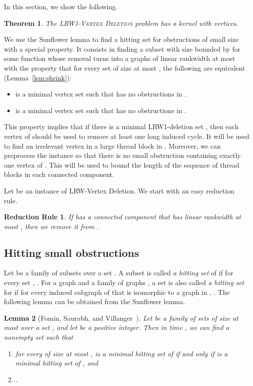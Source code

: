 \documentclass[11pt]{article}
\newtheorem{theorem}{Theorem}[section]
\newtheorem{lemma}[theorem]{Lemma}
\newtheorem{RULE}{Reduction Rule}
\theoremstyle{remark}
\newcommand{\LRWD}{\textsc{LRW1-Vertex Deletion} }
\begin{document}
In this section, we show the following.
\begin{theorem}\label{thm:main22}
The \LRWD problem has a kernel with  vertices.
\end{theorem}


We use the Sunflower lemma to find a hitting set for obstructions of small size with a special property. It consists in finding a subset  with size bounded by  for some function  whose removal turns  into a graphs of linear rankwidth at most  with the property that  for every set  of size at most , the following are equivalent (Lemma~\ref{lem:shrink}):
\begin{itemize}
\item  is a minimal vertex set such that  has no obstructions in . 
\item  is a minimal vertex set such that  has no obstructions in .
\end{itemize} 
This property implies that if there is a minimal LRW1-deletion set , then each vertex of  should be used to remove at least one long induced cycle.
It will be used to find an irrelevant vertex in a large thread block in .
Moreover, we can preprocess the instance so that 
there is no small obstruction containing exactly one vertex of . 
This will be used to bound the length of the sequence of thread blocks in each connected component.

Let  be an instance of {\sc LRW-Vertex Deletion}. 
We start with an easy reduction rule.

\begin{RULE}\label{rule:threadcomponent}
If  has a connected component that has linear rankwidth at most , 
then we remove it from .
\end{RULE}
\subsection{Hitting small obstructions}



Let  be a family of subsets over a set .  A subset  is called \emph{a hitting set} of  if for every set , . 
For a graph  and a family of
graphs , a set  is also called \emph{a hitting set} for  if for every induced subgraph  of  that is isomorphic to a graph in , . 
The following lemma can be obtained from the Sunflower lemma.
	 
\begin{lemma}[Fomin, Saurabh, and Villanger~\cite{FSV2012}]\label{lem:fomin}
Let  be a family of sets of size at most  over a set , and let  be a positive integer. Then in time , we can find a nonempty set  such that
\begin{enumerate}
\item  for every  of size at most ,  is a minimal hitting set of  if and only if  is a minimal hitting set of , and
\item .
\end{enumerate}
\end{lemma}
\end{document}
